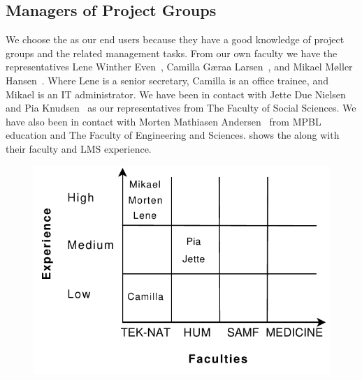 
\subsection{Managers of Project Groups}
\label{sub:enduserstool}
We choose the \admpers{} as our end users because they have a good knowledge of project groups and the related management tasks.
From our own faculty we have the representatives Lene Winther Even~\cite{lene}, Camilla G\ae{}raa Larsen~\cite{camilla}, and Mikael M\o{}ller Hansen~\cite{mikael}.
Where Lene is a senior secretary, Camilla is an office trainee, and Mikael is an IT administrator.
We have been in contact with  Jette Due Nielsen~\cite{jette} and Pia Knudsen~\cite{piak} as our representatives from The Faculty of Social Sciences.
We have also been in contact with Morten Mathiasen Andersen~\cite{morten} from MPBL education and The Faculty of Engineering and Sciences.
 shows the \admpers{} along with their faculty and LMS experience.

\begin{figure}%
\center
\includegraphics[scale=0.50]{images/administratorsOfPG}%
%
\label{fig:adminPG}%
\end{figure}